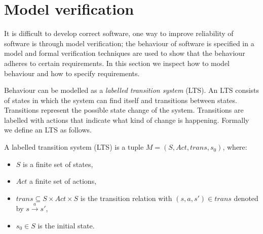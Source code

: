 \section{Model verification}
It is difficult to develop correct software, one way to improve reliability of software is through model verification; the behaviour of software is specified in a model and formal verification techniques are used to show that the behaviour adheres to certain requirements. In this section we inspect how to model behaviour and how to specify requirements.

Behaviour can be modelled as a \textit{labelled transition system} (LTS). An LTS consists of states in which the system can find itself and transitions between states. Transitions represent the possible state change of the system. Transitions are labelled with actions that indicate what kind of change is happening. Formally we define an LTS as follows.
\begin{definition}
	\label{def_lts}
	A labelled transition system (LTS) is a tuple $M = (S, Act, trans, s_0)$, where:
	\begin{itemize}
		\item $S$ is a finite set of states,
		\item $Act$ a finite set of actions,
		\item $trans \subseteq S \times Act \times S$ is the transition relation with $(s,a,s') \in trans$ denoted by $s \xrightarrow a s'$,
		\item $s_0 \in S$ is the initial state.
	\end{itemize}
\end{definition}

